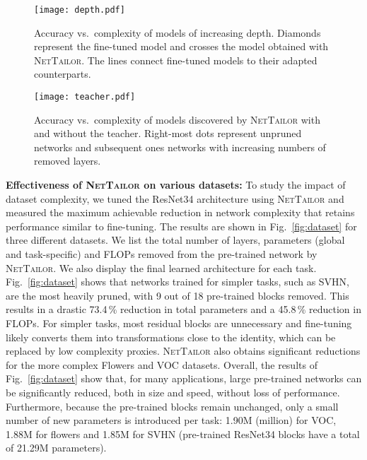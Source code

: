 \documentclass[10pt,twocolumn,letterpaper]{article}
\begin{document}
\begin{figure}[t!]
  \centering
  \texttt{[image: depth.pdf]}
  \caption{Accuracy vs.~complexity of models of increasing depth. Diamonds represent the fine-tuned model and crosses the model obtained with \textsc{NetTailor}. The lines connect fine-tuned models to their adapted counterparts.}
  \label{fig:model_size}
\end{figure}

\begin{figure}[t!]
  \centering
  \texttt{[image: teacher.pdf]}
  \caption{Accuracy vs.~complexity of models discovered by \textsc{NetTailor} with and without the teacher. Right-most dots represent unpruned networks and subsequent ones networks with increasing numbers of removed layers.}
  \label{fig:teacher}
\end{figure}

\noindent
\textbf{Effectiveness of \textsc{NetTailor} on various datasets:}
To study the impact of dataset complexity, we tuned the ResNet34 architecture using \textsc{NetTailor} and measured the maximum achievable reduction in network complexity that retains performance similar to fine-tuning. 
The results are shown in Fig.~\ref{fig:dataset} for three different datasets. We list the total number of layers, parameters (global and task-specific) and FLOPs removed from the pre-trained network by \textsc{NetTailor}. We also display the final learned architecture for each task.
Fig.~\ref{fig:dataset} shows that networks trained for simpler tasks, such as SVHN, are the most heavily pruned, with 9 out of 18 pre-trained blocks removed. This results in a drastic 73.4\,\% reduction in total parameters and a 45.8\,\% reduction in FLOPs.
For simpler tasks, most residual blocks are unnecessary and fine-tuning likely converts them into transformations close to the identity, which can be replaced by low complexity proxies.
\textsc{NetTailor} also obtains significant reductions for the more complex Flowers and VOC datasets.
Overall, the results of Fig.~\ref{fig:dataset} show that, for many applications, large pre-trained networks can be significantly reduced, both in size and speed, without loss of performance. Furthermore, because the pre-trained blocks remain unchanged, only a small number of new parameters is introduced per task: 1.90M (million) for VOC, 1.88M for flowers and 1.85M for SVHN (pre-trained ResNet34 blocks have a total of 21.29M parameters).
\end{document}

